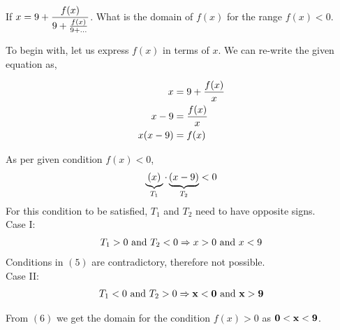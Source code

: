 

\question[3] If $x = 9 + \dfrac{f(x)}{9 + \frac{f(x)}{9 + ...}}$. What
is the domain of $f(x)$ for the range $f(x) < 0$.

\watchout

\begin{solution}[\halfpage]
  To begin with, let us express $f(x)$ in terms of $x$. We can re-write
  the given equation as,
  
  \begin{align}
    x        &= 9 + \dfrac{f(x)}{x} \\
    x-9    &= \dfrac{f(x)}{x} \\
    x(x-9) &= f(x)
  \end{align}
  
  As per given condition $f(x) < 0 $,
  \begin{align}
    \underbrace{(x)}_{T_1} \cdot \underbrace{(x-9)}_{T_2} < 0    
  \end{align}
  For this condition to be satisfied, $T_1$ and $T_2$ need to have
  opposite signs.\\
  
  Case I: 
  \begin{align}
    T_1 > 0 \text{ and } T_2 < 0 \Rightarrow x > 0 \text{ and } x < 9
  \end{align}
  Conditions in $(5)$ are contradictory, therefore not possible.\\
  
  Case II:
  \begin{align}
    T_1 < 0 \text{ and } T_2 > 0 \Rightarrow \mathbf{x < 0 \text{ and } x > 9}
  \end{align}
  
  From $(6)$ we get the domain for the condition $f(x)>0$ as
  $\mathbf{0 < x < 9}$.
  
\end{solution}


